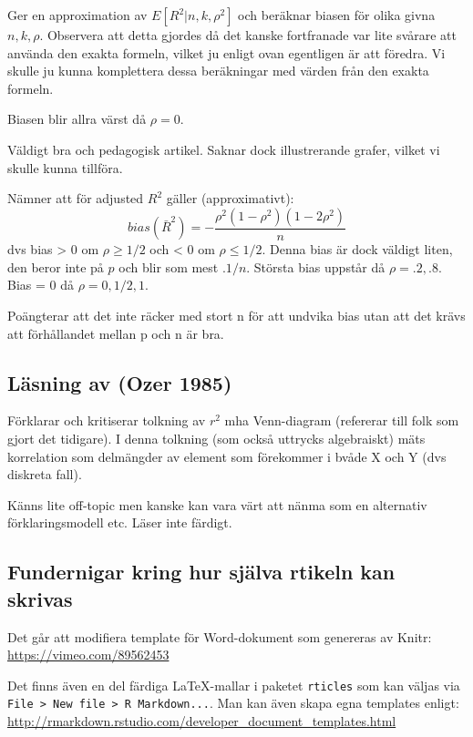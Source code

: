\documentclass[]{article}
\begin{document}
Ger en approximation av \(E[R^2|n, k, \rho^2]\) och beräknar biasen för
olika givna \(n, k, \rho\). Observera att detta gjordes då det kanske
fortfranade var lite svårare att använda den exakta formeln, vilket ju
enligt ovan egentligen är att föredra. Vi skulle ju kunna komplettera
dessa beräkningar med värden från den exakta formeln.

Biasen blir allra värst då \(\rho = 0\).

Väldigt bra och pedagogisk artikel. Saknar dock illustrerande grafer,
vilket vi skulle kunna tillföra.

Nämner att för adjusted \(R^2\) gäller (approximativt):
\[bias(\bar{R}^2) = - \frac{\rho^2(1-\rho^2)(1-2\rho^2)}{n}\] dvs bias
\textgreater{} 0 om \(\rho \geq 1/2\) och \textless{} 0 om
\(\rho \leq 1/2\). Denna bias är dock väldigt liten, den beror inte på
\(p\) och blir som mest \(.1/n\). Största bias uppstår då
\(\rho = .2, .8\). Bias = 0 då \(\rho = 0, 1/2, 1\).

Poängterar att det inte räcker med stort n för att undvika bias utan att
det krävs att förhållandet mellan p och n är bra.

\subsection{Läsning av (Ozer 1985)}\label{lasning-av-ozer1985}

Förklarar och kritiserar tolkning av \(r^2\) mha Venn-diagram (refererar
till folk som gjort det tidigare). I denna tolkning (som också uttrycks
algebraiskt) mäts korrelation som delmängder av element som förekommer i
bvåde X och Y (dvs diskreta fall).

Känns lite off-topic men kanske kan vara värt att nänma som en
alternativ förklaringsmodell etc. Läser inte färdigt.

\subsection{Fundernigar kring hur själva rtikeln kan
skrivas}\label{fundernigar-kring-hur-sjalva-rtikeln-kan-skrivas}

Det går att modifiera template för Word-dokument som genereras av Knitr:
\url{https://vimeo.com/89562453}

Det finns även en del färdiga \LaTeX-mallar i paketet \texttt{rticles}
som kan väljas via
\texttt{File\ \textgreater{}\ New\ file\ \textgreater{}\ R\ Markdown...}.
Man kan även skapa egna templates enligt:
\url{http://rmarkdown.rstudio.com/developer_document_templates.html}
\end{document}
